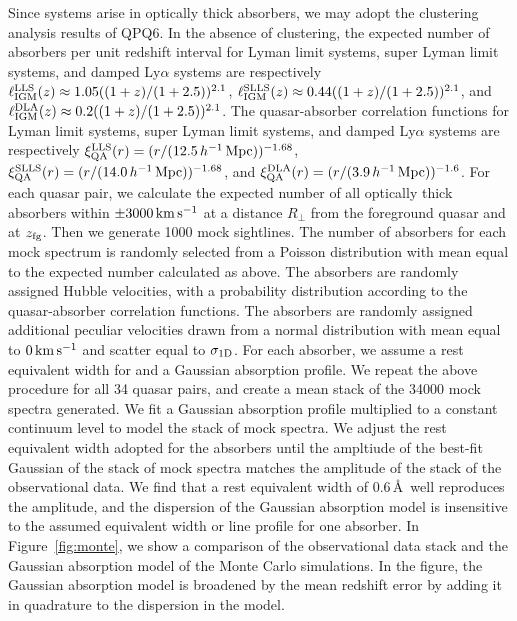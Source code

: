 \documentclass[iop]{emulateapj}
\begin{document}
Since  systems arise in optically thick absorbers, we may adopt the clustering analysis 
results of QPQ6. In the absence of clustering, the expected number of absorbers per unit redshift 
interval for Lyman limit systems, super Lyman limit systems, and damped Ly$\alpha$ systems are 
respectively $\ell_{\rm IGM}^{\rm LLS}(z)\approx1.05((1+z)/(1+2.5))^{2.1}$, 
$\ell_{\rm IGM}^{\rm SLLS}(z)\approx0.44((1+z)/(1+2.5))^{2.1}$, and 
$\ell_{\rm IGM}^{\rm DLA}(z)\approx0.2((1+z)/(1+2.5))^{2.1}$. The quasar-absorber correlation 
functions for Lyman limit systems, super Lyman limit systems, and damped Ly$\alpha$ systems are 
respectively $\xi_{\rm QA}^{\rm LLS}(r)=(r/(12.5\,h^{-1}\,{\rm Mpc}))^{-1.68}$, 
$\xi_{\rm QA}^{\rm SLLS}(r)=(r/(14.0\,h^{-1}\,{\rm Mpc}))^{-1.68}$, and 
$\xi_{\rm QA}^{\rm DLA}(r)=(r/(3.9\,h^{-1}\,{\rm Mpc}))^{-1.6}$. 
For each quasar pair, we calculate the expected number of all optically thick absorbers within 
$\pm3000\,{\rm km\,s^{-1}}$ at a distance $R_\perp$ from the foreground quasar and at 
$z_{\rm fg}$. Then we generate 1000 mock sightlines. The number of absorbers for each mock 
spectrum is randomly selected from a Poisson distribution with mean equal to the expected number 
calculated as above. The absorbers are randomly assigned Hubble velocities, with a probability 
distribution according to the quasar-absorber correlation functions. The absorbers are randomly 
assigned additional peculiar velocities drawn from a normal distribution with mean equal to 
$0\,{\rm km\,s^{-1}}$ and scatter equal to $\sigma_{\rm 1D}$. For each absorber, we 
assume a rest equivalent width for  and a Gaussian absorption profile. We repeat the 
above procedure for all 34 quasar pairs, and create a mean stack of the 34000 mock spectra 
generated. We fit a Gaussian absorption profile multiplied to a constant continuum level to model 
the stack of mock spectra. We adjust the rest equivalent width adopted for the  
absorbers until the ampltiude of the best-fit Gaussian of the stack of mock spectra matches the 
amplitude of the stack of the observational data. We find that a rest equivalent width of 
0.6\,\AA\ well reproduces the amplitude, and the dispersion of the Gaussian absorption model is 
insensitive to the assumed equivalent width or line profile for one absorber. In 
Figure~\ref{fig:monte}, we show a comparison of the observational data stack and the Gaussian 
absorption model of the Monte Carlo simulations. In the figure, the Gaussian absorption model is 
broadened by the mean redshift error by adding it in quadrature to the dispersion in the model. 
\end{document}
